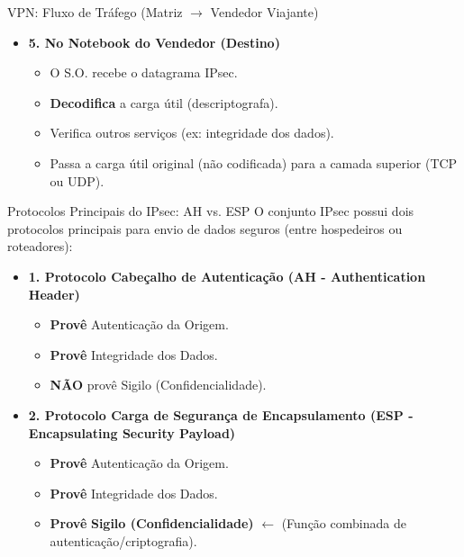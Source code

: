 \begin{frame}{VPN: Fluxo de Tráfego (Matriz $\rightarrow$ Vendedor Viajante)}
\begin{itemize}
        \item \textbf{5. No Notebook do Vendedor (Destino)}
              \begin{itemize}
                  \item O S.O. recebe o datagrama IPsec.
                  \item \textbf{Decodifica} a carga útil (descriptografa).
                  \item Verifica outros serviços (ex: integridade dos dados).
                  \item Passa a carga útil original (não codificada) para a camada superior (TCP ou UDP).
              \end{itemize}
    \end{itemize}
\end{frame}

\begin{frame}{Protocolos Principais do IPsec: AH vs. ESP}
    O conjunto IPsec possui dois protocolos principais para envio de dados seguros (entre hospedeiros ou roteadores):
    \begin{itemize}


        \item \textbf{1. Protocolo Cabeçalho de Autenticação (AH - Authentication Header)}
              \begin{itemize}


                  \item \textbf{Provê} Autenticação da Origem.
                  \item \textbf{Provê} Integridade dos Dados.

                  \item \textbf{NÃO} provê Sigilo (Confidencialidade).
              \end{itemize}

        \item \textbf{2. Protocolo Carga de Segurança de Encapsulamento (ESP - Encapsulating Security Payload)}
              \begin{itemize}


                  \item \textbf{Provê} Autenticação da Origem.
                  \item \textbf{Provê} Integridade dos Dados.
                  \item \textbf{Provê} \textbf{Sigilo (Confidencialidade)} $\leftarrow$ (Função combinada de autenticação/criptografia).

              \end{itemize}
    \end{itemize}
\end{frame}

